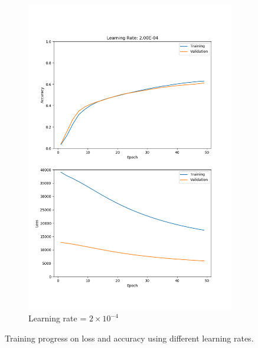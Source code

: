 \documentclass[11pt]{article}
\begin{document}
\begin{figure}[h!]
\begin{subfigure}{.325\textwidth}
      \includegraphics[width=.95\linewidth]{../results/q3_1_2_2E-04.png}
      \caption{Learning rate = $2\times10^{-4}$}
    \end{subfigure}\hfill
    \caption{Training progress on loss and accuracy using different learning rates. }
    \label{fig:q3.1.2}
\end{figure}



\end{document}
